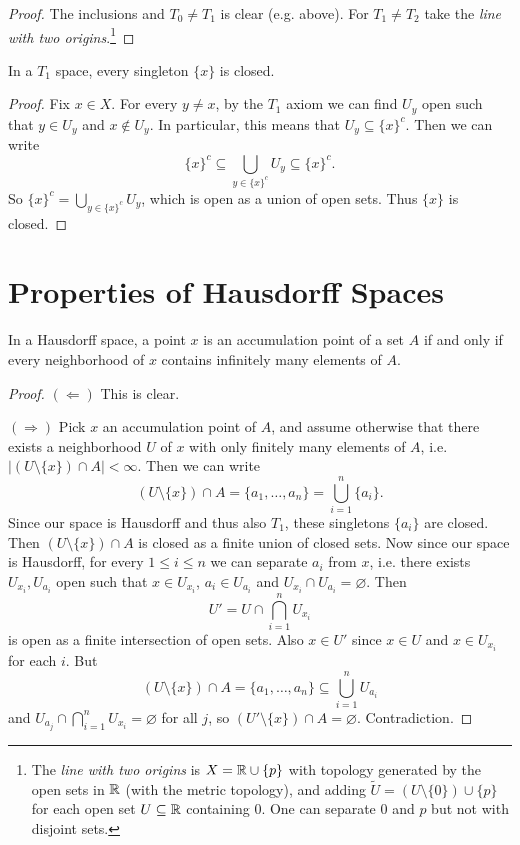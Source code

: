 \begin{proof}
  The inclusions and $T_0 \ne T_1$ is clear (e.g. above). For
  $T_1 \ne T_2$ take the \emph{line with two origins}.\footnote{The \emph{line with two origins} is $X = \mathbb{R} \cup \{p\}$ with topology generated by the open sets in $\mathbb{R}$ (with the metric topology), and adding $\widetilde{U} = (U \setminus \{0\}) \cup \{p\}$ for each open set $U \subseteq \mathbb{R}$ containing $0$. One can separate $0$ and $p$ but not with disjoint sets.}
\end{proof}

\begin{theorem}
  In a $T_1$ space, every singleton $\{x\}$ is
  closed.
\end{theorem}

\begin{proof}
  Fix $x \in X$. For every $y \ne x$, by the
  $T_1$ axiom we can find $U_y$ open such that
  $y \in U_y$ and $x \notin U_y$. In particular,
  this means that $U_y \subseteq \{x\}^c$. Then
  we can write
  \[
    \{x\}^c \subseteq \bigcup_{y \in \{x\}^c} U_y
    \subseteq \{x\}^c.
  \]
  So $\{x\}^c = \bigcup_{y \in \{x\}^c} U_y$,
  which is open as a union of open sets.
  Thus $\{x\}$ is closed.
\end{proof}

\section{Properties of Hausdorff Spaces}
\begin{theorem}
  In a Hausdorff space, a point
  $x$ is an accumulation point of
  a set $A$ if and only if every neighborhood
  of $x$ contains infinitely many elements of $A$.
\end{theorem}

\begin{proof}
  $(\Leftarrow)$ This is clear.

  $(\Rightarrow)$ Pick $x$ an accumulation point
  of $A$, and assume otherwise that there exists a
  neighborhood $U$ of $x$ with only finitely
  many elements of $A$, i.e.
  $|(U \setminus \{x\}) \cap A| < \infty$. Then
  we can write
  \[
    (U \setminus \{x\}) \cap A = \{a_1, \ldots, a_n\}
    = \bigcup_{i = 1}^n \{a_i\}.
  \]
  Since our space is Hausdorff and thus also $T_1$,
  these singletons $\{a_i\}$ are closed. Then
  $(U \setminus \{x\}) \cap A$ is closed as a
  finite union of closed sets. Now since
  our space is Hausdorff, for every
  $1 \le i \le n$ we can separate $a_i$ from $x$,
  i.e. there exists $U_{x_i}, U_{a_i}$ open
  such that $x \in U_{x_i}$, $a_i \in U_{a_i}$
  and $U_{x_i} \cap U_{a_i} = \varnothing$. Then
  \[
    U' = U \cap \bigcap_{i = 1}^n U_{x_i}
  \]
  is open as a finite intersection of open sets.
  Also $x \in U'$ since $x \in U$ and
  $x \in U_{x_i}$ for each $i$. But
  \[
    (U \setminus\{x\}) \cap A
    = \{a_1, \dots, a_n\}
    \subseteq \bigcup_{i = 1}^n U_{a_i}
  \]
  and $U_{a_j} \cap \bigcap_{i = 1}^n U_{x_i} = \varnothing$
  for all $j$, so
  $(U' \setminus \{x\}) \cap A = \varnothing$.
  Contradiction.
\end{proof}

